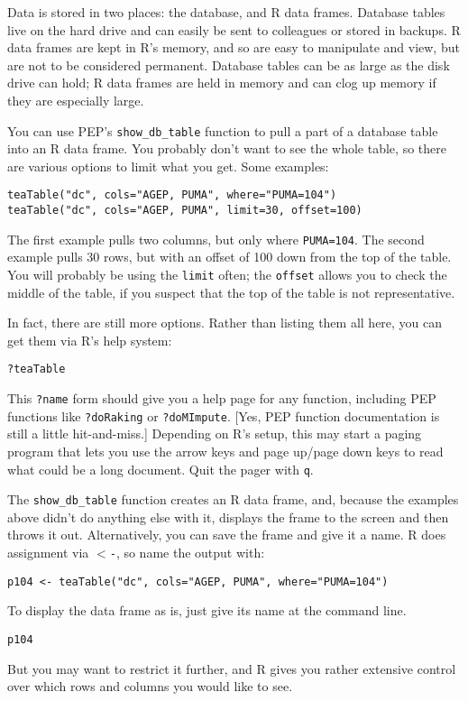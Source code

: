 \documentclass{article}
\begin{document}
Data is stored in two places: the database, and R data frames. Database tables
live on the hard drive and can easily be sent to colleagues or stored in
backups. R data frames are kept in R's memory, and so are easy to manipulate and
view, but are not to be considered permanent. Database tables can be as large as 
the disk drive can hold; R data frames are held in memory and can clog up memory if
they are especially large.

You can use PEP's {\tt show\_db\_table} function to pull a part of a database table into
an R data frame. You probably don't want to see the whole table, so there are
various options to limit what you get. Some examples:
\begin{rcode} 
\begin{verbatim}
teaTable("dc", cols="AGEP, PUMA", where="PUMA=104")
teaTable("dc", cols="AGEP, PUMA", limit=30, offset=100)
\end{verbatim}
\end{rcode} 
The first example pulls two columns, but only where {\tt PUMA=104}. The second
example pulls 30 rows, but with an offset of 100 down from the top of the
table. You will probably be using the {\tt limit} often; the {\tt offset} allows
you to check the middle of the table, if you suspect that the top of the table
is not representative.

In fact, there are still more options. Rather than listing them all here, you can get them
via R's help system:
\begin{rcode} 
\begin{verbatim}
?teaTable
\end{verbatim}
\end{rcode} 
This {\tt ?name} form should give you a help page for any function, including PEP
functions like {\tt ?doRaking} or {\tt ?doMImpute}. [Yes, PEP function documentation is still a
little hit-and-miss.] Depending on R's
setup, this may start a paging program that lets you use the arrow keys and page
up/page down keys to read what could be a long document. Quit the pager with {\tt q}.

The {\tt show\_db\_table} function creates an R data frame, and, because the examples above didn't do
anything else with it, displays the frame to the screen and then throws it out. Alternatively, you can
save the frame and give it a name. R does assignment via {\tt $<$-}, so name the output
with:
\begin{rcode} 
\begin{verbatim}
p104 <- teaTable("dc", cols="AGEP, PUMA", where="PUMA=104")
\end{verbatim}
\end{rcode} 
To display the data frame as is, just give its name at the command line.
\begin{rcode} 
\begin{verbatim}
p104
\end{verbatim}
\end{rcode} 
But you may want to restrict it further, and R gives you rather extensive control over
which rows and columns you would like to see.
\end{document}
